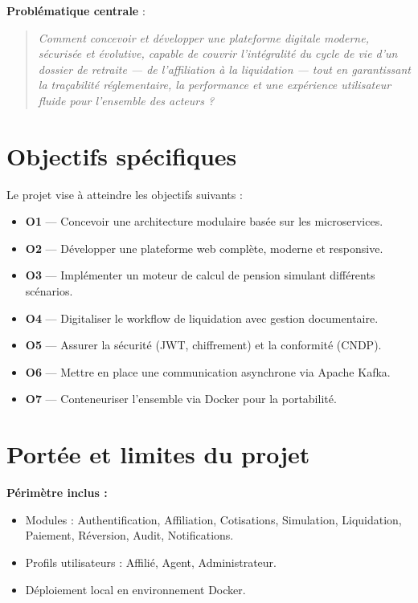 \documentclass[12pt,a4paper,oneside]{report}
\begin{document}
\textbf{Problématique centrale} :

\begin{quote}
\itshape
Comment concevoir et développer une plateforme digitale moderne, sécurisée et évolutive, capable de couvrir l'intégralité du cycle de vie d'un dossier de retraite --- de l'affiliation à la liquidation --- tout en garantissant la traçabilité réglementaire, la performance et une expérience utilisateur fluide pour l'ensemble des acteurs ?
\end{quote}

\section{Objectifs spécifiques}
Le projet vise à atteindre les objectifs suivants :
\begin{itemize}
    \item \textbf{O1} --- Concevoir une architecture modulaire basée sur les microservices.
    \item \textbf{O2} --- Développer une plateforme web complète, moderne et responsive.
    \item \textbf{O3} --- Implémenter un moteur de calcul de pension simulant différents scénarios.
    \item \textbf{O4} --- Digitaliser le workflow de liquidation avec gestion documentaire.
    \item \textbf{O5} --- Assurer la sécurité (JWT, chiffrement) et la conformité (CNDP).
    \item \textbf{O6} --- Mettre en place une communication asynchrone via Apache Kafka.
    \item \textbf{O7} --- Conteneuriser l'ensemble via Docker pour la portabilité.
\end{itemize}

\section{Portée et limites du projet}

\textbf{Périmètre inclus :}
\begin{itemize}
    \item Modules : Authentification, Affiliation, Cotisations, Simulation, Liquidation, Paiement, Réversion, Audit, Notifications.
    \item Profils utilisateurs : Affilié, Agent, Administrateur.
    \item Déploiement local en environnement Docker.
\end{itemize}
\end{document}
